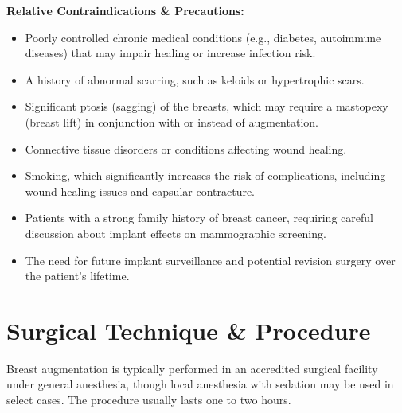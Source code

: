 \textbf{Relative Contraindications \& Precautions:}
\begin{itemize}
  \item Poorly controlled chronic medical conditions (e.g., diabetes, autoimmune diseases) that may impair healing or increase infection risk.
  \item A history of abnormal scarring, such as keloids or hypertrophic scars.
  \item Significant ptosis (sagging) of the breasts, which may require a mastopexy (breast lift) in conjunction with or instead of augmentation.
  \item Connective tissue disorders or conditions affecting wound healing.
  \item Smoking, which significantly increases the risk of complications, including wound healing issues and capsular contracture.
  \item Patients with a strong family history of breast cancer, requiring careful discussion about implant effects on mammographic screening.
  \item The need for future implant surveillance and potential revision surgery over the patient's lifetime.
\end{itemize}

\section*{Surgical Technique \& Procedure}
Breast augmentation is typically performed in an accredited surgical facility under general anesthesia, though local anesthesia with sedation may be used in select cases. The procedure usually lasts one to two hours.

